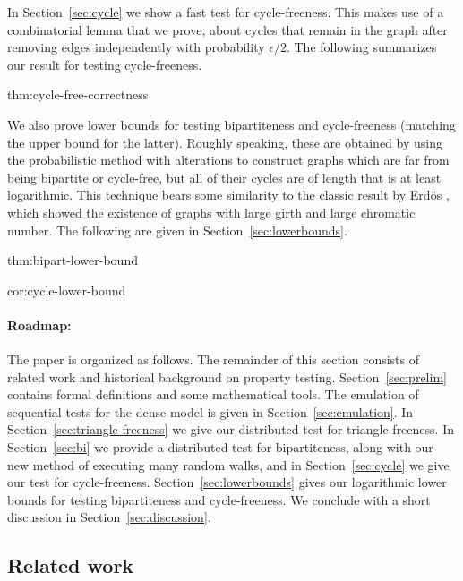 \documentclass[11pt]{article}
\newenvironment{theorem-repeat}[1]{\begin{trivlist}
		\item[\hspace{\labelsep}{\bf\noindent Theorem \ref{#1} }]\em }{\end{trivlist}}
\begin{document}
In Section~\ref{sec:cycle} we show a fast test for cycle-freeness. This makes use of a combinatorial lemma that we prove, about cycles that remain in the graph after removing edges independently with probability $\epsilon/2$. 
The following summarizes our result for testing cycle-freeness.
\begin{theorem-repeat}{thm:cycle-free-correctness}
\ThmCycle
\end{theorem-repeat}

We also prove lower bounds for testing bipartiteness and cycle-freeness (matching the upper bound for the latter). Roughly speaking, these are obtained by using the probabilistic method with alterations to construct graphs which are far from being bipartite or cycle-free, but all of their cycles are of length that is at least logarithmic. This technique bears some similarity to the classic result by Erd{\"o}s \cite{erdos1959graph}, which showed the existence of graphs with large girth and large chromatic number. The following are given in Section~\ref{sec:lowerbounds}.
\begin{theorem-repeat}{thm:bipart-lower-bound}
\ThmLBBi
\end{theorem-repeat}

\begin{theorem-repeat}{cor:cycle-lower-bound}
\ThmLBCycle
\end{theorem-repeat}
\paragraph{Roadmap:}
The paper is organized as follows. The remainder of this section consists of related work and historical background on property testing.
Section~\ref{sec:prelim} contains formal definitions and some mathematical tools.
The emulation of sequential tests for the dense model is given in Section~\ref{sec:emulation}. In Section~\ref{sec:triangle-freeness} we give our distributed test for triangle-freeness.
In Section~\ref{sec:bi} we provide a distributed test for bipartiteness, along with our new method of executing many random walks, and in Section~\ref{sec:cycle} we give our test for cycle-freeness. Section~\ref{sec:lowerbounds} gives our logarithmic lower bounds for testing bipartiteness and cycle-freeness.
We conclude with a short discussion in Section~\ref{sec:discussion}.

\subsection{Related work}
\end{document}
